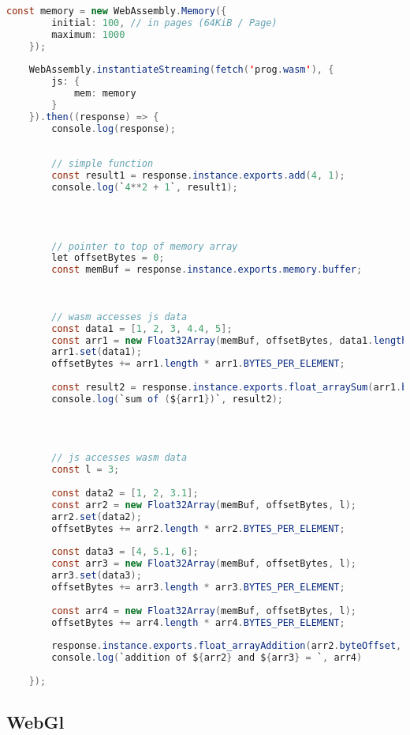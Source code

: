 \begin{lstlisting}[language=java]
    const memory = new WebAssembly.Memory({
        initial: 100, // in pages (64KiB / Page)
        maximum: 1000
    });
    
    WebAssembly.instantiateStreaming(fetch('prog.wasm'), {
        js: {
            mem: memory
        }
    }).then((response) => {
        console.log(response);
    
    
        // simple function
        const result1 = response.instance.exports.add(4, 1);
        console.log(`4**2 + 1`, result1);
    
    
    
    
        // pointer to top of memory array
        let offsetBytes = 0;
        const memBuf = response.instance.exports.memory.buffer;
    
    
    
        // wasm accesses js data
        const data1 = [1, 2, 3, 4.4, 5];
        const arr1 = new Float32Array(memBuf, offsetBytes, data1.length);
        arr1.set(data1);
        offsetBytes += arr1.length * arr1.BYTES_PER_ELEMENT;
        
        const result2 = response.instance.exports.float_arraySum(arr1.byteOffset, arr1.length);
        console.log(`sum of (${arr1})`, result2);
    
    
    
    
        // js accesses wasm data
        const l = 3;
    
        const data2 = [1, 2, 3.1];
        const arr2 = new Float32Array(memBuf, offsetBytes, l);
        arr2.set(data2);
        offsetBytes += arr2.length * arr2.BYTES_PER_ELEMENT;
    
        const data3 = [4, 5.1, 6];
        const arr3 = new Float32Array(memBuf, offsetBytes, l);
        arr3.set(data3);
        offsetBytes += arr3.length * arr3.BYTES_PER_ELEMENT;
    
        const arr4 = new Float32Array(memBuf, offsetBytes, l);
        offsetBytes += arr4.length * arr4.BYTES_PER_ELEMENT;
    
        response.instance.exports.float_arrayAddition(arr2.byteOffset, arr3.byteOffset, arr4.byteOffset, l);
        console.log(`addition of ${arr2} and ${arr3} = `, arr4)
        
    });
\end{lstlisting}


\subsection{WebGl}

